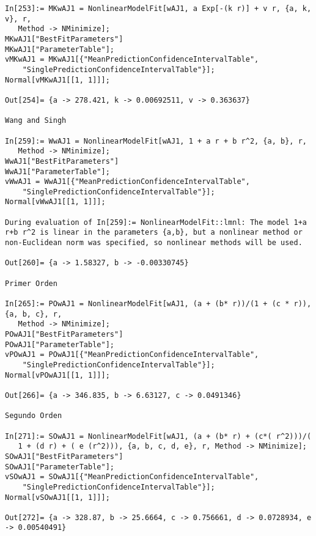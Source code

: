 \begin{lstlisting}
In[253]:= MKwAJ1 = NonlinearModelFit[wAJ1, a Exp[-(k r)] + v r, {a, k, v}, r, 
   Method -> NMinimize];
MKwAJ1["BestFitParameters"]
MKwAJ1["ParameterTable"];
vMKwAJ1 = MKwAJ1[{"MeanPredictionConfidenceIntervalTable", 
    "SinglePredictionConfidenceIntervalTable"}];
Normal[vMKwAJ1[[1, 1]]];

Out[254]= {a -> 278.421, k -> 0.00692511, v -> 0.363637}

Wang and Singh

In[259]:= WwAJ1 = NonlinearModelFit[wAJ1, 1 + a r + b r^2, {a, b}, r, 
   Method -> NMinimize];
WwAJ1["BestFitParameters"]
WwAJ1["ParameterTable"];
vWwAJ1 = WwAJ1[{"MeanPredictionConfidenceIntervalTable", 
    "SinglePredictionConfidenceIntervalTable"}];
Normal[vWwAJ1[[1, 1]]];

During evaluation of In[259]:= NonlinearModelFit::lmnl: The model 1+a r+b r^2 is linear in the parameters {a,b}, but a nonlinear method or non-Euclidean norm was specified, so nonlinear methods will be used.

Out[260]= {a -> 1.58327, b -> -0.00330745}

Primer Orden

In[265]:= POwAJ1 = NonlinearModelFit[wAJ1, (a + (b* r))/(1 + (c * r)), {a, b, c}, r, 
   Method -> NMinimize];
POwAJ1["BestFitParameters"]
POwAJ1["ParameterTable"];
vPOwAJ1 = POwAJ1[{"MeanPredictionConfidenceIntervalTable", 
    "SinglePredictionConfidenceIntervalTable"}];
Normal[vPOwAJ1[[1, 1]]];

Out[266]= {a -> 346.835, b -> 6.63127, c -> 0.0491346}

Segundo Orden

In[271]:= SOwAJ1 = NonlinearModelFit[wAJ1, (a + (b* r) + (c*( r^2)))/(
   1 + (d r) + ( e (r^2))), {a, b, c, d, e}, r, Method -> NMinimize];
SOwAJ1["BestFitParameters"]
SOwAJ1["ParameterTable"];
vSOwAJ1 = SOwAJ1[{"MeanPredictionConfidenceIntervalTable", 
    "SinglePredictionConfidenceIntervalTable"}];
Normal[vSOwAJ1[[1, 1]]];

Out[272]= {a -> 328.87, b -> 25.6664, c -> 0.756661, d -> 0.0728934, e -> 0.00540491}

\end{lstlisting}

